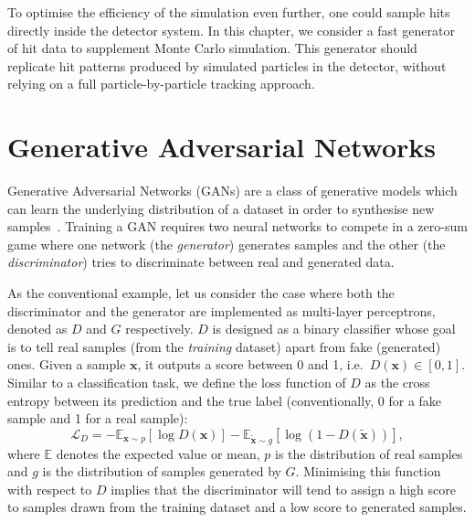 To optimise the efficiency of the simulation even further,
one could sample hits directly inside the detector system. In this chapter, we
consider a fast generator of hit data to supplement Monte Carlo simulation.
This generator should replicate hit patterns produced by simulated particles in
the detector, without relying on a full particle-by-particle tracking approach.



\section{Generative Adversarial Networks}
Generative Adversarial Networks (GANs) are a class of generative models which
can learn the underlying distribution of a dataset in order to synthesise new
samples~\cite{goodfellow_generative_2014}. Training a GAN requires two neural
networks to compete in a zero-sum game where one network (the \emph{generator})
generates samples and the other (the \emph{discriminator}) tries to discriminate
between real and generated data.

As the conventional example, let us consider the case where both the
discriminator and the generator are implemented as multi-layer perceptrons,
denoted as $D$ and $G$ respectively. $D$ is designed as a binary classifier
whose goal is to tell real samples (from the \emph{training} dataset) apart from
fake (generated) ones. Given a sample $\bm{x}$, it outputs a score between 0
and 1, i.e.\ $D(\bm{x}) \in [0, 1]$. Similar to a classification task, we
define the loss function of $D$ as the cross entropy between its prediction and
the true label (conventionally, 0 for a fake sample and 1 for a real sample):
\begin{equation}\label{eq:D_loss}
    \mathcal{L}_D =
    -\mathbb{E}_{\bm{x} \sim p} [ \log D(\bm{x}) ] -
    \mathbb{E}_{\tilde{\bm{x}} \sim g} [ \log( 1 - D(\tilde{\bm{x}}) )],
\end{equation}
where $\mathbb{E}$ denotes the expected value or mean, $p$ is the distribution
of real samples and $g$ is the distribution of samples generated by $G$.
Minimising this function with respect to $D$ implies that the discriminator will
tend to assign a high score to samples drawn from the training dataset and a low
score to generated samples.


